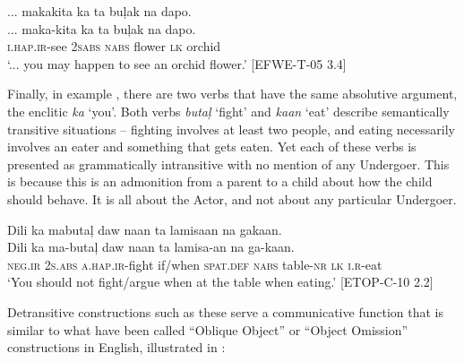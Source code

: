 \ea
\label{bkm:Ref117000354}
... makakita      ka      ta  buļak  na  dapo. \\\smallskip
\gll ... maka-kita      ka      ta  buļak  na  dapo. \\
{}  \textsc{i.hap.ir}-see  \textsc{2sabs}      \textsc{nabs}  flower  \textsc{lk}  orchid \\
\glt ‘... you may happen to see an orchid flower.’ [EFWE-T-05 3.4]
\z

Finally, in example , there are two verbs that have the same absolutive argument, the enclitic \textit{ka} ‘you’. Both verbs \textit{butaļ} ‘fight’ and \textit{kaan} ‘eat’ describe semantically transitive situations – fighting involves at least two people, and eating necessarily involves an eater and something that gets eaten. Yet each of these verbs is presented as grammatically intransitive with no mention of any Undergoer. This is because this is an admonition from a parent to a child about how the child should behave. It is all about the Actor, and not about any particular Undergoer.

\ea
\label{bkm:Ref117000205}
Dili    ka    mabutaļ  daw  naan  ta  lamisaan  na  gakaan. \\\smallskip
\gll Dili    ka    ma-butaļ  daw  naan  ta  lamisa-an  na  ga-kaan. \\
\textsc{neg.ir}  2\textsc{s.abs}    \textsc{a.hap.ir-}fight  if/when  \textsc{spat.def}  \textsc{nabs}  table-\textsc{nr}  \textsc{lk}  \textsc{i.r}-eat \\
\glt `You should not fight/argue when at the table when eating.' [ETOP-C-10 2.2]
\z

Detransitive constructions such as these serve a communicative function that is similar to what have been called “Oblique Object” or “Object Omission” constructions in English, illustrated in :


